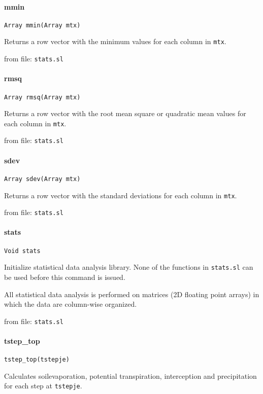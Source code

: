 \paragraph{mmin}
\begin{verbatim}
Array mmin(Array mtx)
\end{verbatim}
Returns a row vector with the minimum values for each column
in {\tt mtx}.

from file: {\tt stats.sl}


\paragraph{rmsq}
\begin{verbatim}
Array rmsq(Array mtx)
\end{verbatim}
Returns a row vector with the root mean square or quadratic
mean values for each column in {\tt mtx}.

from file: {\tt stats.sl}


\paragraph{sdev}
\begin{verbatim}
Array sdev(Array mtx)
\end{verbatim}
Returns a row vector with the standard deviations for each
column in {\tt mtx}.

from file: {\tt stats.sl}


\paragraph{stats}
\begin{verbatim}
Void stats
\end{verbatim}
Initialize statistical data analysis library. None of the
functions in {\tt stats.sl} can be used before this command is
issued.


All statistical data analysis is performed on matrices (2D
floating point arrays) in which the data are column-wise
organized.

from file: {\tt stats.sl}


\paragraph{tstep\_top}
\begin{verbatim}
tstep_top(tstepje)
\end{verbatim}
Calculates soilevaporation, potential transpiration, interception
and precipitation for each step at {\tt tstepje}.


